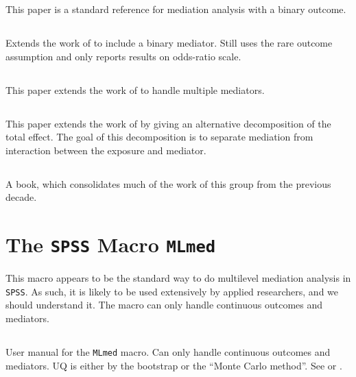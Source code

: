 \documentclass{report}
\begin{document}
This paper is a standard reference for mediation analysis with a binary outcome.

\subsection{\citet{Val13}}

Extends the work of \citet{Van10} to include a binary mediator. Still uses the rare outcome assumption and only reports results on odds-ratio scale.

\subsection{\citet{Van13}}

This paper extends the work of \citet{Van09} to handle multiple mediators.

\subsection{\citet{Van14}}

This paper extends the work of \citet{Van09} by giving an alternative decomposition of the total effect. The goal of this decomposition is to separate mediation from interaction between the exposure and mediator.

\subsection{\citet{Van15}}

A book, which consolidates much of the work of this group from the previous decade.




\section{The \texttt{SPSS} Macro \texttt{MLmed}}
\label{sec:MLmed}

This macro appears to be the standard way to do multilevel mediation analysis in \texttt{SPSS}. As such, it is likely to be used extensively by applied researchers, and we should understand it. The macro can only handle continuous outcomes and mediators.

\subsection{\citet{Roc19}}

User manual for the \texttt{MLmed} macro. Can only handle continuous outcomes and mediators. UQ is either by the bootstrap or the ``Monte Carlo method''. See \citet{Pre12} or \citet{Wil08}.
\end{document}
